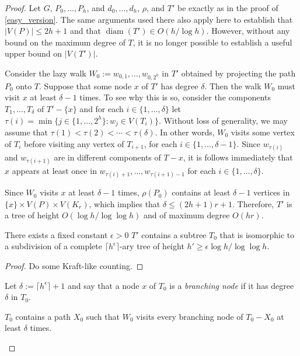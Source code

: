 \documentclass{patmorin}
\newcommand{\defin}[1]{\emph{\color{brightmaroon}#1}}
\DeclareMathOperator{\diam}{diam}
\begin{document}
\begin{proof}
  Let $G$, $P_0,\ldots,P_h$, and $d_0,\ldots,d_h$, $\rho$, and $T'$ be exactly as in the proof of \cref{easy_version}.  The same arguments used there also apply here to establish that $|V(P)|\le 2h+1$ and that $\diam(T')\in O(h/\log h)$.  However, without any bound on the maximum degree of $T$, it is no longer possible to establish a useful upper bound on $|V(T')|$.

  Consider the lazy walk $W_0:=w_{0,1},\ldots,w_{0,2^h}$ in $T'$ obtained by projecting the path $P_0$ onto $T$.  Suppose that some node $x$ of $T'$ has degree $\delta$.  Then the walk $W_0$ must visit $x$ at least $\delta-1$ times.  To see why this is so, consider the components $T_1,\ldots,T_\delta$ of $T'-\{x\}$ and for each $i\in\{1,\ldots,\delta\}$ let $\tau(i)=\min\{j\in \{1,\ldots,2^h\}: w_j\in V(T_i)\}$.  Without loss of generality, we may assume that $\tau(1) < \tau(2) <\cdots < \tau(\delta)$.  In other words, $W_0$ visits some vertex of $T_i$ before visiting any vertex of $T_{i+1}$, for each $i\in\{1,\ldots,\delta-1\}$.  Since $w_{\tau(i)}$ and $w_{\tau(i+1)}$ are in different components of $T-x$, it is follows immediately that $x$ appears at least once in $w_{\tau(i)+1},\ldots,w_{\tau(i+1)-1}$ for each $i\in\{1,\ldots,\delta\}$.

  Since $W_0$ visits $x$ at least $\delta-1$ times, $\rho(P_0)$ contains at least $\delta-1$ vertices in $\{x\}\times V(P)\times V(K_r)$, which implies that $\delta \le (2h+1)r + 1$.  Therefore, $T'$ is a tree of height $O(\log h/\log\log h)$ and of maximum degree $O(hr)$.

  \begin{clm}\label{big_logeps_subdivision}
    There exists a fixed constant $\epsilon >0$
    $T'$ contains a subtree $T_0$ that is isomorphic to a subdivision of a complete $\lceil h^\epsilon\rceil$-ary tree of height $h'\ge\epsilon\log h/\log\log h$.
  \end{clm}

  \begin{proof}
    Do some Kraft-like counting.
  \end{proof}

  Let $\delta:=\lceil h^{\epsilon}\rceil+1$ and say that a node $x$ of $T_0$ is a \defin{branching node} if it has degree $\delta$ in $T_0$.

  \begin{clm}
    $T_0$ contains a path $X_0$ such that $W_0$ visits every branching node of $T_0-X_0$ at least $\delta$ times.
  \end{clm}


\end{proof}
\end{document}
